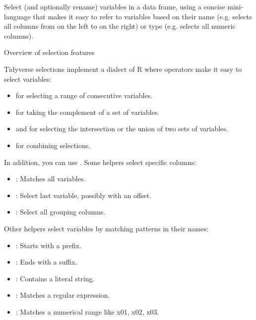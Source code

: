 \documentclass[a4paper]{book}
\begin{document}
%
\begin{Description}
Select (and optionally rename) variables in a data frame, using a concise
mini-language that makes it easy to refer to variables based on their name
(e.g.  selects all columns from  on the left to  on the
right) or type (e.g.  selects all numeric columns).
%
\begin{SubSection}{Overview of selection features}

Tidyverse selections implement a dialect of R where operators make
it easy to select variables:
\begin{itemize}

\item{} \code{:} for selecting a range of consecutive variables.
\item{} \code{!} for taking the complement of a set of variables.
\item{} \code{\&} and \code{|} for selecting the intersection or the union of two
sets of variables.
\item{}  for combining selections.

\end{itemize}


In addition, you can use . Some helpers select specific
columns:
\begin{itemize}

\item{} : Matches all variables.
\item{} : Select last variable, possibly with an offset.
\item{} : Select all grouping columns.

\end{itemize}


Other helpers select variables by matching patterns in their names:
\begin{itemize}

\item{} : Starts with a prefix.
\item{} : Ends with a suffix.
\item{} : Contains a literal string.
\item{} : Matches a regular expression.
\item{} : Matches a numerical range like x01, x02, x03.


\end{itemize}
\end{SubSection}
\end{Description}
\end{document}
